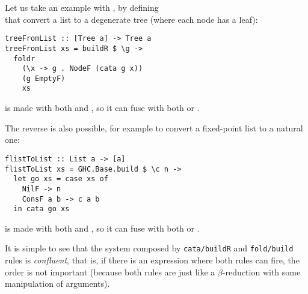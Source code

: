 Let us take an example with , by defining\\  that convert a list to a degenerate tree (where each node has a leaf):
\begin{verbatim}
treeFromList :: [Tree a] -> Tree a
treeFromList xs = buildR $ \g ->
  foldr
    (\x -> g . NodeF (cata g x))
    (g EmptyF)
    xs
\end{verbatim}
\noindent {} is made with both  and , so it can fuse with both  or .

The reverse is also possible, for example to convert a fixed-point list to a natural one:
\begin{verbatim}
flistToList :: List a -> [a]
flistToList xs = GHC.Base.build $ \c n ->
  let go xs = case xs of
    NilF -> n
    ConsF a b -> c a b
  in cata go xs
\end{verbatim}
\noindent {} is made with both  and , so it can fuse with both  or .

It is simple to see that the system composed by \verb|cata/buildR| and \verb|fold/build| rules is \emph{confluent}, that is, if there is an expression where both rules can fire, the order is not important (because both rules are just like a $\beta$-reduction with some manipulation of arguments).